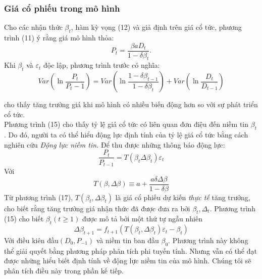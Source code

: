 \documentclass[10pt,a4paper]{article}
\begin{document}
	\subsubsection{Giá cổ phiếu trong mô hình}
	Cho các nhận thức $\beta_t$, hàm kỳ vọng (12) và giả định trên giá cổ tức, phương trình (11) ý rằng giá mô hình thỏa:
	\begin{equation}
	P_t=\frac{\beta aD_t}{1-\delta\beta_t}.
	\end{equation}
	Khi $\beta_t$ và $\varepsilon_t$ độc lập, phương trình trước có nghĩa:
	\begin{equation}
	Var\left(\ln\frac{P_t}{P_{t}-1}\right)=Var\left(\ln\frac{1-\delta\beta_{t-1}}{1-\delta \beta_t}\right)+Var\left(\ln\frac{D_t}{D_{t-1}}\right)
	\end{equation}
	
	cho thấy tăng trưởng giá khi mô hình có nhiều biến động hơn so với sự phát triển cổ tức.\\
	
	Phương trình (15) cho thấy tỷ lệ giá cổ tức có liên quan đơn điệu đến niềm tin $\beta_t$.
	Do đó, người ta có thể hiểu động lực định tính của tỷ lệ giá cổ tức bằng cách nghiên cứu
	\textit{Động lực niềm tin.} Để thu được những thông báo động lực:
	\begin{equation}
	\frac{P_t}{P_{t-1}}=T{(\beta_t\Delta\beta_t)\varepsilon_t}
	\end{equation}
	Với 
	\begin{equation}
	T(\beta,\Delta\beta)\equiv a+\frac{a\delta\Delta\beta}{1-\delta\beta}
	\end{equation}
	Từ phương trình (17), $T(\beta_t,\Delta\beta_t)$ 
	là giá cổ phiếu dự kiến \textit{thực tế} tăng trưởng, cho biết rằng tăng trưởng giá nhận thức đã được đưa ra bởi $\beta_t,\Delta_t$. Phương trình (15) cho biết $\beta_t(t\ge 1)$ được mô tả bởi một thứ tự ngẫu nhiên
	\begin{equation}
	\Delta\beta_{t+1}=f_{t+1}(T(\beta_t,\Delta\beta_t)\varepsilon_t-\beta_t)
	\end{equation}
	Với điều kiên đầu$(D_0,P_{-1})$ và niềm tin ban đầu $\beta_0$. Phương trình này không thể giải quyết bằng phương pháp phân tích phi tuyến tính. Nhưng vẫn có thể đạt được những hiểu biết định tính về động lực niềm tin của mô hình. Chúng tôi sẽ phân tích điều này trong phần kế tiếp.
\end{document}
